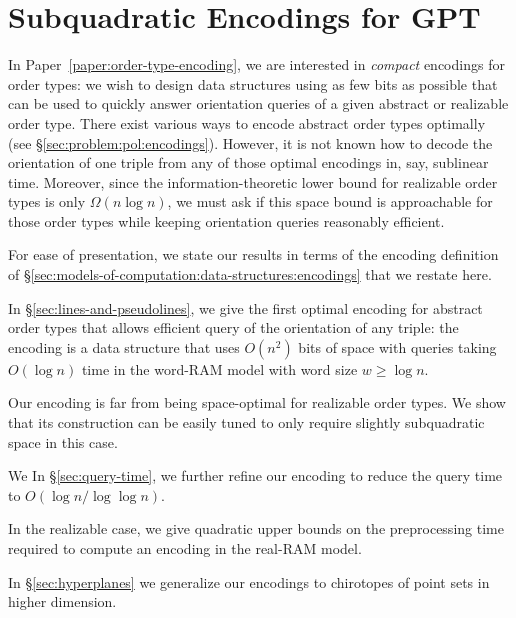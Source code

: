 \section{Subquadratic Encodings for GPT}


In Paper~\ref{paper:order-type-encoding},
we are interested in \emph{compact} encodings for
order types: we wish to design data structures using as few bits as possible
that can be used to quickly answer orientation queries of a given abstract or
realizable order type.
%
There exist various ways to encode abstract order types optimally (see
\S\ref{sec:problem:pol:encodings}).
%
However, it is not known how to decode the orientation of one triple from any
of those optimal encodings in, say, sublinear time.
%
Moreover, since the information-theoretic lower bound for realizable order
types is only \(\Omega(n \log n)\), we must ask if this space bound is
approachable for those order types while keeping orientation queries reasonably
efficient.

For ease of presentation, we state our results in terms of the encoding
definition of \S\ref{sec:models-of-computation:data-structures:encodings} that
we restate here.
%
\DefinitionEncoding*

In \S\ref{sec:lines-and-pseudolines}, we
give the first optimal encoding for abstract
order types that allows efficient query of the orientation of any triple: the
encoding is a data structure that uses \( O(n^2) \) bits of space with queries
taking \(O(\log n)\) time in the word-RAM model with word size \(w \geq \log
n\).

%
Our encoding is far from being space-optimal for realizable order types.
We show that its construction can be easily tuned to only require
slightly subquadratic space in this case.

%
\ifeurocg%
We \else%
In \S\ref{sec:query-time}, we \fi%
further refine our encoding to
reduce the query time to \(O(\log{n}/\log{\log{n}})\).


%
In the realizable case, we give quadratic upper bounds on the
preprocessing time required to compute an encoding in the real-RAM model.

%
In \S\ref{sec:hyperplanes} we
generalize our encodings to chirotopes of
point sets in higher dimension.



